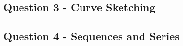 \documentclass[a4paper,12pt]{article}
\begin{document}
\subsection*{Question 3 - Curve Sketching}
%	
%	
%	
%	
%	
%	
%


\subsection*{Question 4 - Sequences and Series}
%
%
%	
%
%	
%
%	
%	
%
%	
%
%		
%	
%	
%	
%	
\end{document}

